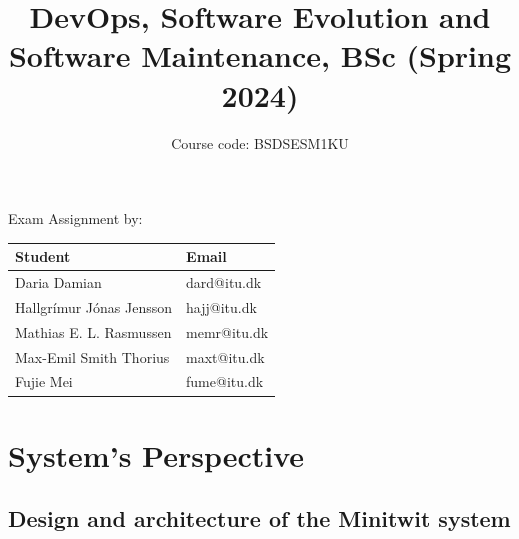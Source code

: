 \documentclass[12pt, a4paper, oneside]{book}
\title{DevOps, Software Evolution and Software Maintenance, BSc (Spring 2024)}
\author{Course code: BSDSESM1KU}
\begin{document}
\begin{minipage}{\textwidth}
\maketitle

\begin{center}
    Exam Assignment by: \\
    \hfill \break
    \bgroup
    \def\arraystretch{1.5}%
    \begin{tabularx}{0.8\textwidth} { 
      | >{\centering\arraybackslash}X 
      | >{\centering\arraybackslash}X | }
     \hline
     \cellcolor[HTML]{EFEFEF} Student & \cellcolor[HTML]{EFEFEF} Email \\
     \hline
     Daria Damian & dard@itu.dk \\
     \hline
     Hallgrímur Jónas Jensson & hajj@itu.dk \\
    \hline
     Mathias E. L. Rasmussen & memr@itu.dk \\
    \hline
     Max-Emil Smith Thorius & maxt@itu.dk \\
    \hline
    Fujie Mei & fume@itu.dk \\
    \hline
    \end{tabularx}
    \egroup
\end{center}
\end{minipage}

\tableofcontents

\chapter{System's Perspective}
\label{chap:System's Perspective}

\section{Design and architecture of the Minitwit system}
\label{sec:Design and architecture of the Minitwit system}


\end{document}
